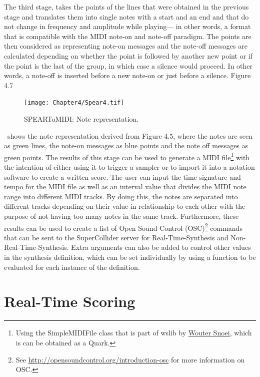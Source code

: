 The third stage, takes the points of the lines that were obtained in the previous stage and translates them into single notes with a start and an end and that do not change in frequency and amplitude while playing--- in other words, a format that is compatible with the MIDI note-on and note-off paradigm. The points are then considered as representing note-on messages and the note-off messages are calculated depending on whether the point is followed by another new point or if the point is the last of the group, in which case a silence would proceed. In other words, a note-off is inserted before a new note-on or just before a silence. Figure 4.7 
\begin{figure}[htbp] %
   \centering
   \texttt{[image: Chapter4/Spear4.tif]} %
   \caption{SPEARToMIDI: Note representation.}
   \label{fig:example}
\end{figure}\
shows the note representation derived from Figure 4.5, where the notes are seen as green lines, the note-on messages as blue points and the note off messages as green points. 
The results of this stage can be used to generate a MIDI file\footnote{Using the SimpleMIDIFile class that is part of wslib by \href{http://www.woutersnoei.nl/}{Wouter Snoei}, which is can be obtained as a Quark.} with the intention of either using it to trigger a sampler or to import it into a notation software to create a written score. The user can input the time signature and tempo for the MIDI file as well as an interval value that divides the MIDI note range into different MIDI tracks. By doing this, the notes are separated into different tracks depending on their value in relationship to each other with the purpose of not having too many notes in the same track. Furthermore, these results can be used to create a list of Open Sound Control (OSC)\footnote{See \href{http://opensoundcontrol.org/introduction-osc}{http://opensoundcontrol.org/introduction-osc} for more information on OSC.} commands that can be sent to the SuperCollider server for Real-Time-Synthesis and Non-Real-Time-Synthesis. Extra arguments can also be added to control other values in the synthesis definition, which can be set individually by using a function to be evaluated for each instance of the definition.

\section{Real-Time Scoring}

